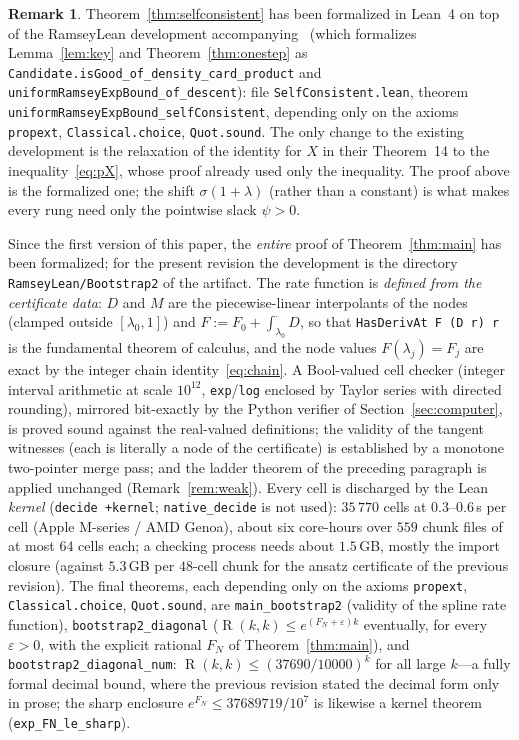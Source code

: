 \documentclass[11pt]{article}
\theoremstyle{definition}
\newtheorem{remark}[theorem]{Remark}
\newcommand{\eps}{\varepsilon}
\newcommand{\lam}{\lambda}
\DeclareMathOperator{\Ram}{R}
\begin{document}
\begin{remark}\label{rem:lean}
Theorem~\ref{thm:selfconsistent} has been formalized in Lean~4 on top of the RamseyLean development accompanying~\cite{GNNW} (which formalizes Lemma~\ref{lem:key} and Theorem~\ref{thm:onestep} as \texttt{Candidate.isGood\_of\_density\_card\_product} and \texttt{uniformRamseyExpBound\_of\_descent}): file \texttt{SelfConsistent.lean}, theorem \texttt{uniformRamseyExpBound\_selfConsistent}, depending only on the axioms \texttt{propext}, \texttt{Classical.choice}, \texttt{Quot.sound}.  The only change to the existing development is the relaxation of the identity for $X$ in their Theorem~14 to the inequality~\eqref{eq:pX}, whose proof already used only the inequality.  The proof above is the formalized one; the shift $\sigma(1+\lam)$ (rather than a constant) is what makes every rung need only the pointwise slack $\psi>0$.

Since the first version of this paper, the \emph{entire} proof of Theorem~\ref{thm:main} has been formalized; for the present revision the development is the directory \texttt{RamseyLean/Bootstrap2} of the artifact.  The rate function is \emph{defined from the certificate data}: $D$ and $M$ are the piecewise-linear interpolants of the nodes (clamped outside $[\lam_0,1]$) and $F:=F_0+\int_{\lam_0}^{\cdot}D$, so that \texttt{HasDerivAt F (D r) r} is the fundamental theorem of calculus, and the node values $F(\lam_j)=F_j$ are exact by the integer chain identity~\eqref{eq:chain}.  A Bool-valued cell checker (integer interval arithmetic at scale $10^{12}$, \texttt{exp}/\texttt{log} enclosed by Taylor series with directed rounding), mirrored bit-exactly by the Python verifier of Section~\ref{sec:computer}, is proved sound against the real-valued definitions; the validity of the tangent witnesses (each is literally a node of the certificate) is established by a monotone two-pointer merge pass; and the ladder theorem of the preceding paragraph is applied unchanged (Remark~\ref{rem:weak}).  Every cell is discharged by the Lean \emph{kernel} (\texttt{decide +kernel}; \texttt{native\_decide} is not used): $35\,770$ cells at $0.3$--$0.6$\,s per cell (Apple M-series / AMD Genoa), about six core-hours over $559$ chunk files of at most $64$ cells each; a checking process needs about $1.5$\,GB, mostly the import closure (against $5.3$\,GB per $48$-cell chunk for the ansatz certificate of the previous revision).  The final theorems, each depending only on the axioms \texttt{propext}, \texttt{Classical.choice}, \texttt{Quot.sound}, are \texttt{main\_bootstrap2} (validity of the spline rate function), \texttt{bootstrap2\_diagonal} ($\Ram(k,k)\le e^{(F_N+\eps)k}$ eventually, for every $\eps>0$, with the explicit rational $F_N$ of Theorem~\ref{thm:main}), and \texttt{bootstrap2\_diagonal\_num}: $\Ram(k,k)\le(37690/10000)^k$ for all large $k$---a fully formal decimal bound, where the previous revision stated the decimal form only in prose; the sharp enclosure $e^{F_N}\le 37689719/10^{7}$ is likewise a kernel theorem (\texttt{exp\_FN\_le\_sharp}).
\end{remark}
\end{document}
